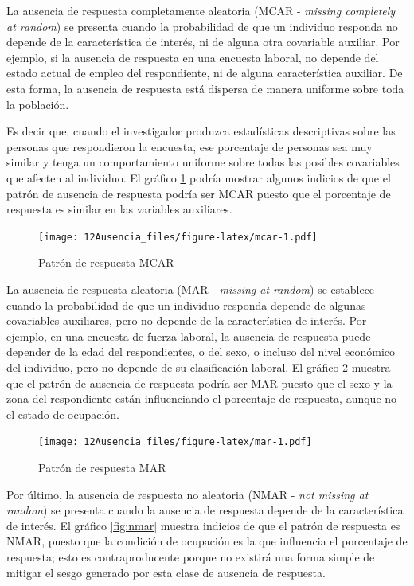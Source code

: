 \documentclass[
  12pt,
]{book}
\begin{document}
La ausencia de respuesta completamente aleatoria (MCAR - \emph{missing completely at random}) se presenta cuando la probabilidad de que un individuo responda no depende de la característica de interés, ni de alguna otra covariable auxiliar. Por ejemplo, si la ausencia de respuesta en una encuesta laboral, no depende del estado actual de empleo del respondiente, ni de alguna característica auxiliar. De esta forma, la ausencia de respuesta está dispersa de manera uniforme sobre toda la población.

Es decir que, cuando el investigador produzca estadísticas descriptivas sobre las personas que respondieron la encuesta, ese porcentaje de personas sea muy similar y tenga un comportamiento uniforme sobre todas las posibles covariables que afecten al individuo. El gráfico \ref{fig:mcar} podría mostrar algunos indicios de que el patrón de ausencia de respuesta podría ser MCAR puesto que el porcentaje de respuesta es similar en las variables auxiliares.

\begin{figure}
\centering
\texttt{[image: 12Ausencia\_files/figure-latex/mcar-1.pdf]}
\caption{\label{fig:mcar}Patrón de respuesta MCAR}
\end{figure}

La ausencia de respuesta aleatoria (MAR - \emph{missing at random}) se establece cuando la probabilidad de que un individuo responda depende de algunas covariables auxiliares, pero no depende de la característica de interés. Por ejemplo, en una encuesta de fuerza laboral, la ausencia de respuesta puede depender de la edad del respondientes, o del sexo, o incluso del nivel económico del individuo, pero no depende de su clasificación laboral. El gráfico \ref{fig:mar} muestra que el patrón de ausencia de respuesta podría ser MAR puesto que el sexo y la zona del respondiente están influenciando el porcentaje de respuesta, aunque no el estado de ocupación.

\begin{figure}
\centering
\texttt{[image: 12Ausencia\_files/figure-latex/mar-1.pdf]}
\caption{\label{fig:mar}Patrón de respuesta MAR}
\end{figure}

Por último, la ausencia de respuesta no aleatoria (NMAR - \emph{not missing at random}) se presenta cuando la ausencia de respuesta depende de la característica de interés. El gráfico \ref{fig:nmar} muestra indicios de que el patrón de respuesta es NMAR, puesto que la condición de ocupación es la que influencia el porcentaje de respuesta; esto es contraproducente porque no existirá una forma simple de mitigar el sesgo generado por esta clase de ausencia de respuesta.
\end{document}
